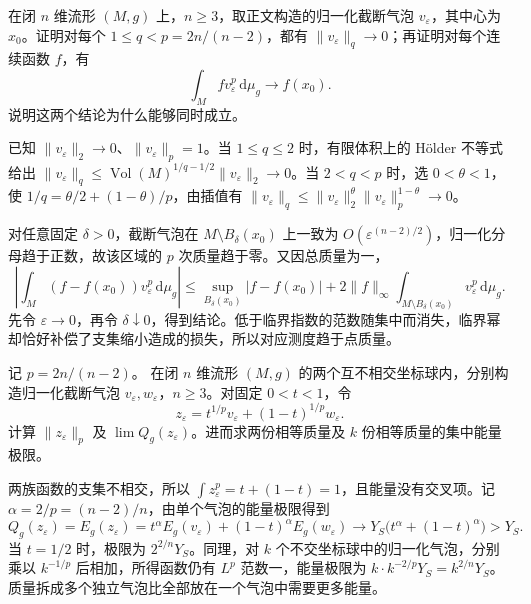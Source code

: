 \begin{exercise}\label{g3:ex:yamabe-subcritical-bubble-norms}
	在闭 \(n\) 维流形 \((M,g)\) 上，\(n\ge3\)，取正文构造的归一化截断气泡 \(v_\varepsilon\)，其中心为 \(x_0\)。证明对每个 \(1\le q<p=2n/(n-2)\)，都有 \(\|v_\varepsilon\|_q\to0\)；再证明对每个连续函数 \(f\)，有
	\[
		\int_M f v_\varepsilon^p\,\mathrm d\mu_g\longrightarrow f(x_0).
	\]
	说明这两个结论为什么能够同时成立。
\end{exercise}
\begin{solution}
	已知 \(\|v_\varepsilon\|_2\to0\)、\(\|v_\varepsilon\|_p=1\)。当 \(1\le q\le2\) 时，有限体积上的 Hölder 不等式给出 \(\|v_\varepsilon\|_q\le\operatorname{Vol}(M)^{1/q-1/2}\|v_\varepsilon\|_2\to0\)。当 \(2<q<p\) 时，选 \(0<\theta<1\)，使 \(1/q=\theta/2+(1-\theta)/p\)，由插值有 \(\|v_\varepsilon\|_q\le\|v_\varepsilon\|_2^\theta\|v_\varepsilon\|_p^{1-\theta}\to0\)。

	对任意固定 \(\delta>0\)，截断气泡在 \(M\setminus B_\delta(x_0)\) 上一致为 \(O(\varepsilon^{(n-2)/2})\)，归一化分母趋于正数，故该区域的 \(p\) 次质量趋于零。又因总质量为一，
	\[
		\left|\int_M(f-f(x_0))v_\varepsilon^p\,\mathrm d\mu_g\right|
		\le\sup_{B_\delta(x_0)}|f-f(x_0)|
		+2\|f\|_\infty\int_{M\setminus B_\delta(x_0)}v_\varepsilon^p\,\mathrm d\mu_g.
	\]
	先令 \(\varepsilon\to0\)，再令 \(\delta\downarrow0\)，得到结论。低于临界指数的范数随集中而消失，临界幂却恰好补偿了支集缩小造成的损失，所以对应测度趋于点质量。
\end{solution}

\begin{exercise}\label{g3:ex:yamabe-two-bubbles-cost}
	记 \(p=2n/(n-2)\)。
	在闭 \(n\) 维流形 \((M,g)\) 的两个互不相交坐标球内，分别构造归一化截断气泡 \(v_\varepsilon,w_\varepsilon\)，\(n\ge3\)。对固定 \(0<t<1\)，令
	\[
		z_\varepsilon=t^{1/p}v_\varepsilon+(1-t)^{1/p}w_\varepsilon.
	\]
	计算 \(\|z_\varepsilon\|_p\) 及 \(\lim Q_g(z_\varepsilon)\)。进而求两份相等质量及 \(k\) 份相等质量的集中能量极限。
\end{exercise}
\begin{solution}
	两族函数的支集不相交，所以 \(\int z_\varepsilon^p=t+(1-t)=1\)，且能量没有交叉项。记 \(\alpha=2/p=(n-2)/n\)，由单个气泡的能量极限得到
	\[
		Q_g(z_\varepsilon)=E_g(z_\varepsilon)
		=t^\alpha E_g(v_\varepsilon)+(1-t)^\alpha E_g(w_\varepsilon)
		\longrightarrow Y_S\bigl(t^\alpha+(1-t)^\alpha\bigr)>Y_S.
	\]
	当 \(t=1/2\) 时，极限为 \(2^{2/n}Y_S\)。同理，对 \(k\) 个不交坐标球中的归一化气泡，分别乘以 \(k^{-1/p}\) 后相加，所得函数仍有 \(L^p\) 范数一，能量极限为 \(k\cdot k^{-2/p}Y_S=k^{2/n}Y_S\)。质量拆成多个独立气泡比全部放在一个气泡中需要更多能量。
\end{solution}

